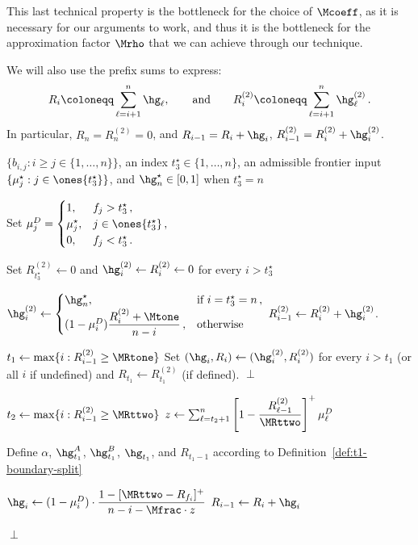 This last technical property is the bottleneck for the choice of $\Mcoeff$, as it is necessary for our arguments to work, and thus it is the bottleneck for the approximation factor $\Mrho$ that we can achieve through our technique.

We will also use the prefix sums to express:
\begin{equation*}
    R_i \coloneqq \sum_{\ell=i+1}^n \hg_\ell, \qquad\text{and}\qquad R_i^{(2)} \coloneqq \sum_{\ell=i+1}^n \hg_\ell^{(2)}\,.
\end{equation*}
In particular, $R_n=R_n^{(2)}=0$, and $R_{i-1}=R_i+\hg_i$, $R_{i-1}^{(2)}=R_i^{(2)}+\hg_i^{(2)}$.

\begin{algorithm}[H]
\caption{Construction of the profile $\hg$}\label{alg:general-case-procedure-hgi}
\begin{algorithmic}[1]
    \Require $\{b_{i,j} : i\ge j\in\{1,\dots,n\}\}$, an index $t_3^\star\in\{1,\dots,n\}$, an admissible frontier input $\{\mu_j^\star : j\in\ones{t_3^\star}\}$, and $\hg_n^\star\in[0,1]$ when $t_3^\star=n$

    \State Set
    $\mu_j^D=
    \begin{cases}
        1, & f_j>t_3^\star\,,\\
        \mu_j^\star, & j\in\ones{t_3^\star}\,,\\
        0, & f_j<t_3^\star\,.
    \end{cases}$

    \State Set $R_{t_3^\star}^{(2)}\gets 0$ and $\hg_i^{(2)}\gets R_i^{(2)}\gets 0$ for every $i>t_3^\star$

     \label{line:phase-2-loop}
        \State $\hg_i^{(2)}\gets
        \begin{cases}
            \hg_n^\star, & \text{if $i=t_3^\star=n$}\,,\\
            (1-\mu_i^D)\dfrac{R_i^{(2)}+\Mtone}{n-i}\,, & \text{otherwise}
        \end{cases}$
        \State $R_{i-1}^{(2)}\gets R_i^{(2)}+\hg_i^{(2)}$.
    \EndFor

    \State $t_1\gets \max\{i : R_{i-1}^{(2)}\ge \MRtone\}$ \label{line:R_i-1-smaller-0.79-condition}
    \State Set $(\hg_i,R_i)\gets (\hg_i^{(2)},R_i^{(2)})$ for every $i>t_1$ (or all $i$ if undefined) and $R_{t_1}\gets R_{t_1}^{(2)}$ (if defined).
     \label{line:t_1-perp-condition}
        \State \Return $\perp$
    \EndIf

    \State $t_2\gets \max\{i : R_{i-1}^{(2)}\ge \MRttwo\}$
    \State $z\gets \sum_{\ell=t_2+1}^{n}\left[1-\dfrac{R_{\ell-1}^{(2)}}{\MRttwo}\right]^+\mu_\ell^D$

    \State Define $\alpha$, $\hg_{t_1}^A$, $\hg_{t_1}^B$, $\hg_{t_1}$, and $R_{t_1-1}$ according to Definition~\ref{def:t1-boundary-split}

        \State $\hg_i \gets (1-\mu_i^D)\cdot\dfrac{1-[\MRttwo-R_{f_i}]^+}{n-i-\Mfrac\cdot z}$
        \State $R_{i-1} \gets R_i + \hg_i$
    \EndFor

        \State \Return $\perp$
    \EndIf
\end{algorithmic}
\end{algorithm}


